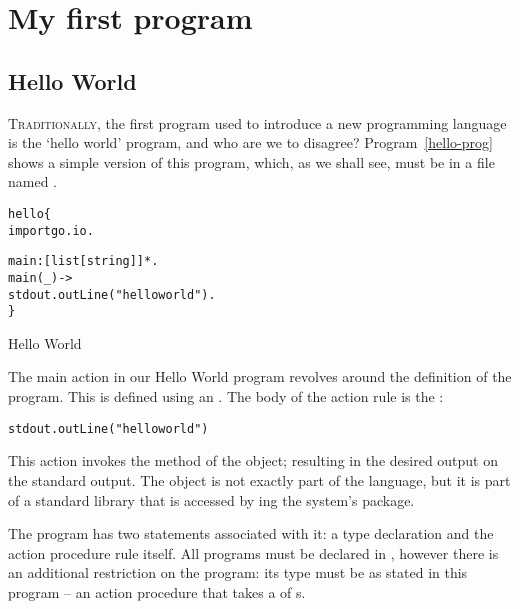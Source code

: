 \chapter{My first \go program}
\label{first}

\section{Hello World}
\lettrine{T}{raditionally}, the first program used to introduce a new programming language is the `hello world' program, and who are we to disagree? Program~\vref{hello-prog} shows a simple version of this program, which, as we shall see, must be in a file named .
\begin{program}
\vspace{0.5ex}
\begin{alltt}
hello\{
  import go.io.
  
  main:[list[string]]*.
  main(_) ->
    stdout.outLine("hello world").
\}
\end{alltt}
\vspace{-2ex}
\caption{Hello World\label{hello-prog}}
\end{program}

\noindent
{}
The main action in our Hello World program revolves around the definition of the  program. This is defined using an . The body of the action rule is the :
\begin{alltt}
stdout.outLine("hello world")
\end{alltt}
This action invokes the  method of the  object; resulting in the desired output on the standard output. The  object is not exactly part of the language, but it is part of a standard library that is accessed by ing the system's  package.

The  program has two statements associated with it: a type declaration and the action procedure rule itself. All programs must be declared in \go, however there is an additional restriction on the  program: its type must be as stated in this program -- an action procedure that takes a  of s.

